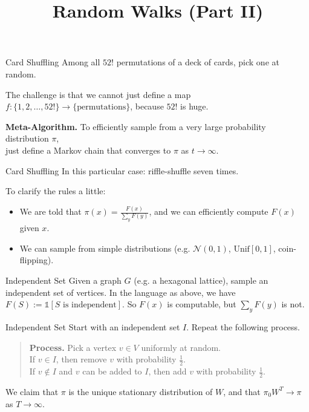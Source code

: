 \title{Random Walks (Part II)}



\begin{problem}{Card Shuffling}
    Among all $52!$ permutations of a deck of cards, pick one at random.
\end{problem}

The challenge is that we cannot just define a map $f: \{1, 2, \dots, 52!\} \to \{\text{permutations}\}$, because $52!$ is huge.

\begin{center}
    \textbf{Meta-Algorithm.} To efficiently sample from a very large probability distribution $\pi$, \\ just define a Markov chain that converges to $\pi$ as $t \to \infty$.
\end{center}

\begin{solution}{Card Shuffling}
    In this particular case: riffle-shuffle seven times.
\end{solution}

To clarify the rules a little:
\begin{itemize}
    \item We are told that $\pi(x) = \frac{F(x)}{\sum_y F(y)}$, and we can efficiently compute $F(x)$ given $x$.
    \item We can sample from simple distributions (e.g. $\mathcal{N}(0, 1)$, $\mathrm{Unif}[0, 1]$, coin-flipping).
\end{itemize}

\begin{problem}{Independent Set}
    Given a graph $G$ (e.g. a hexagonal lattice), sample an independent set of vertices.  In the language as above, we have $F(S) := \mathds{1}[S \text{ is independent}]$.  So $F(x)$ is computable, but $\sum_{y} F(y)$ is not.
\end{problem}

\begin{solution}{Independent Set}
    Start with an independent set $I$.  Repeat the following process.
    \begin{quote}
        \textbf{Process.} Pick a vertex $v \in V$ uniformly at random. \\
        If $v \in I$, then remove $v$ with probability $\frac{1}{2}$. \\
        If $v \not \in I$ and $v$ can be added to $I$, then add $v$ with probability $\frac{1}{2}$.
    \end{quote}
    We claim that $\pi$ is the unique stationary distribution of $W$, and that $\pi_0W^T \to \pi$ as $T \to \infty$.
\end{solution}

